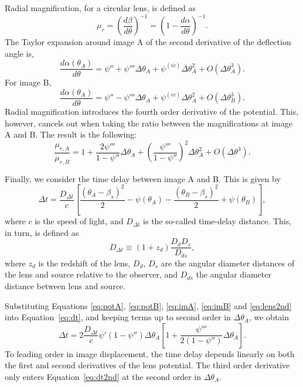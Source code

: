 \documentclass[usenatbib]{mnras}
\def\psii{\psi'}
\def\psiii{\psi''}
\def\psiiii{\psi'''}
\def\psiiv{\psi^{(iv)}}
\def\Eref#1{Equation~\ref{#1}\xspace}
\begin{document}
Radial magnification, for a circular lens, is defined as
\begin{equation}
\mu_r = \left(\frac{d\beta}{d\theta}\right)^{-1} = \left(1 - \frac{d\alpha}{d\theta}\right)^{-1}.
\end{equation}
The Taylor expansion around image A of the second derivative of the deflection angle is,
\begin{equation}
\frac{d\alpha(\theta_A)}{d\theta} = \psiii + \psiiii\Delta\theta_A + \psiiv\Delta\theta_A^2 + O(\Delta\theta_A^3).
\end{equation}
For image B,
\begin{equation}
\frac{d\alpha(\theta_A)}{d\theta} = \psiii - \psiiii\Delta\theta_A + \psiiv\Delta\theta_A^2 + O(\Delta\theta_B^3).
\end{equation}
Radial magnification introduces the fourth order derivative of the potential. This, however, cancels out when taking the ratio between the magnifications at image A and B. The result is the following:
\begin{equation}\label{eq:radmagrat}
\frac{\mu_{r,A}}{\mu_{r,B}} = 1 + \frac{2\psiiii}{1-\psiii}\Delta\theta_A + \left(\frac{\psiiii}{1-\psiii}\right)^2\Delta\theta_A^2 + O(\Delta\theta^3).
\end{equation}

Finally, we consider the time delay between image A and B. This is given by
\begin{equation}\label{eq:dt}
\Delta t = \frac{D_{\Delta t}}{c}\left[\frac{(\theta_A - \beta_s)^2}{2} - \psi(\theta_A) - \frac{(\theta_B - \beta_s)^2}{2} + \psi(\theta_B)\right],
\end{equation}
where $c$ is the speed of light, and $D_{\Delta t}$ is the so-called time-delay distance. This, in turn, is defined as
\begin{equation}
D_{\Delta t} \equiv (1+z_d) \frac{D_d D_s}{D_{ds}},
\end{equation}
where $z_d$ is the redshift of the lens, $D_d$, $D_s$ are the angular diameter distances of the lens and source relative to the observer, and $D_{ds}$ the angular diameter distance between lens and source. 

Substituting Equations \ref{eq:potA}, \ref{eq:potB}, \ref{eq:imA}, \ref{eq:imB} and \ref{eq:lens2nd} into \Eref{eq:dt}, and keeping terms up to second order in $\Delta\theta_A$, we obtain
\begin{equation}\label{eq:dt2nd}
\Delta t = 2\frac{D_{\Delta t}}{c}\psii(1 - \psiii)\Delta\theta_A\left[1 + \frac{\psiiii}{2(1 - \psiii)}\Delta\theta_A\right].
\end{equation}
%
To leading order in image displacement, the time delay depends linearly on both the first and second derivatives of the lens potential. The third order derivative only enters \Eref{eq:dt2nd} at the second order in $\Delta\theta_A$.
\end{document}
